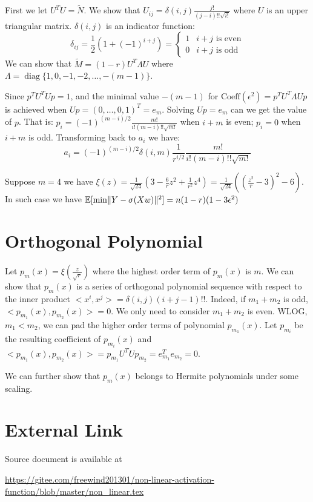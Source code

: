 \documentclass{article}
\DeclarePairedDelimiter\norm{\lVert}{\rVert}
\def\E{\mathbb{E}}
\DeclareMathOperator*{\diag}{diag}
\begin{document}
First we let $U^T U = \widetilde{N}$. We show that $U_{ij} = \delta(i,j)\frac{j!}{(j-i)!!\sqrt{i!}}$ where $U$ is an upper triangular matrix. $\delta(i,j)$ is an indicator function:
\begin{equation}
\delta_{ij} = \frac{1}{2}(1+(-1)^{i+j})=\begin{cases}
1 & i+j \textrm{ is even} \\
0 & i+j \textrm{ is odd}
\end{cases}
\end{equation}
We can show that $\widetilde{M} = (1-r)U^T \Lambda U$ where $\Lambda = \diag\{1,0, -1, -2, \dots, -(m-1)\}$.

Since $p^T U^T U p = 1$, and the minimal value $-(m-1)$ for $\textrm{Coeff}(\epsilon^2) = p^T U^T \Lambda U p $ is achieved when $U p = (0, \dots, 0, 1)^T = e_m$. Solving $ U p = e_m $ can we get the value of $p$. That is: $p_i = (-1)^{(m-i)/2} \frac{m!}{i!(m-i)!! \sqrt{m!}} $ when $i+m$ is even; $p_i = 0 $ when $i+m$ is odd. Transforming back to $a_i$ we have:
\begin{equation}
a_i =(-1)^{(m-i)/2} \delta(i,m) \frac{1}{r^{i/2}} \frac{m!}{i!(m-i)!! \sqrt{m!}}
\end{equation}

Suppose  $ m = 4$ we have $ \xi(z) = \frac{1}{\sqrt{24}}(3 - \frac{6}{r} z^2 + \frac{1}{r^2}z^4)  = \frac{1}{\sqrt{24}}((\frac{z^2}{r} - 3)^2 - 6)$. In such case we have $\E[\min \norm{Y - \sigma(Xw)}^2]=n(1-r)(1-3\epsilon^2)$
\section{Orthogonal Polynomial}
Let $p_m(x) = \xi(\frac{z}{\sqrt{r}})$ where the highest order term of $p_m(x)$ is $m$. We can show that $p_m(x)$ is a series of orthogonal polynomial sequence with respect to the inner product 
$<x^i, x^j> = \delta(i,j)(i+j-1)!!$. Indeed, if $m_1 + m_2$ is odd, $<p_{m_1}(x), p_{m_2}(x)> = 0$.
We only need to consider $m_1 + m_2$ is even. WLOG, $m_1 < m_2$, we can pad the higher order terms of polynomial $p_{m_1}(x)$. Let $p_{m_i}$ be the resulting coefficient of $p_{m_i}(x)$
and $<p_{m_1}(x), p_{m_2}(x)> = p_{m_1}U^TUp_{m_2} = e^T_{m_1} e_{m_2} = 0$.

We can further show that $p_m(x)$ belongs to Hermite polynomials under some scaling.
\section{External Link}
Source document is available at 

\url{https://gitee.com/freewind201301/non-linear-activation-function/blob/master/non_linear.tex}
\end{document}
